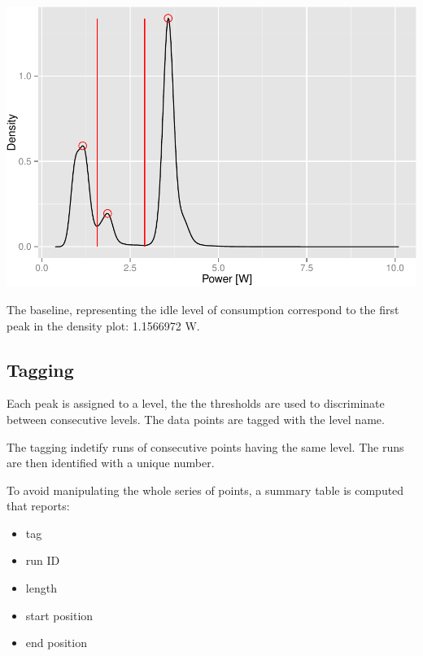 \documentclass[]{article}
\begin{document}
\includegraphics{AnalysisProcedure_files/figure-latex/density-1.pdf}

The baseline, representing the idle level of consumption correspond to
the first peak in the density plot: 1.1566972 W.

\subsection{Tagging}\label{tagging}

Each peak is assigned to a level, the the thresholds are used to
discriminate between consecutive levels. The data points are tagged with
the level name.

The tagging indetify runs of consecutive points having the same level.
The runs are then identified with a unique number.

To avoid manipulating the whole series of points, a summary table is
computed that reports:

\begin{itemize}
\itemsep1pt\parskip0pt
\item
  tag
\item
  run ID
\item
  length
\item
  start position
\item
  end position
\end{itemize}
\end{document}
